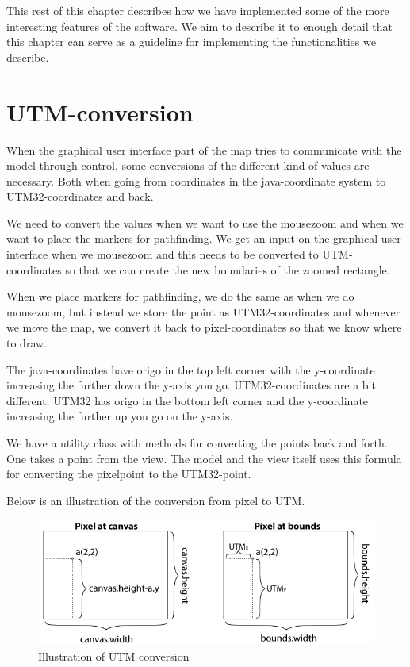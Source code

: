 This rest of this chapter describes how we have implemented some of the more
interesting features of the software. We aim to describe it to enough detail that this
chapter can serve as a guideline for implementing the functionalities we
describe.

\section{UTM-conversion}
\label{IMPL-UTM}
When the graphical user interface part of the map tries to communicate with the
model through control, some conversions of the different kind of values are
necessary. Both when going from coordinates in the java-coordinate system to
UTM32-coordinates and back. 

We need to convert the values when we want to use the mousezoom and when we want
to place the markers for pathfinding. We get an input on the graphical user
interface when we mousezoom and this needs to be converted to UTM-coordinates so
that we can create the new boundaries of the zoomed rectangle.

When we place markers for pathfinding, we do the same as when we do mousezoom,
but instead we store the point as UTM32-coordinates and whenever we move the
map, we convert it back to pixel-coordinates so that we know where to draw.

The java-coordinates have origo in the top left corner with the y-coordinate
increasing the further down the y-axis you go. UTM32-coordinates are a bit
different. UTM32 has origo in the bottom left corner and the y-coordinate
increasing the further up you go on the y-axis.

We have a utility class with methods for converting the points back and forth.
One takes a point from the view. The model and the view itself uses this formula
for converting the pixelpoint to the UTM32-point.

Below is an illustration of the conversion from pixel to UTM.

\begin{figure}[!ht]
\centering
\includegraphics[width=1\linewidth]{images/UTMillu}
\caption{Illustration of UTM conversion}
\label{fig:UTMconversion}
\end{figure}

